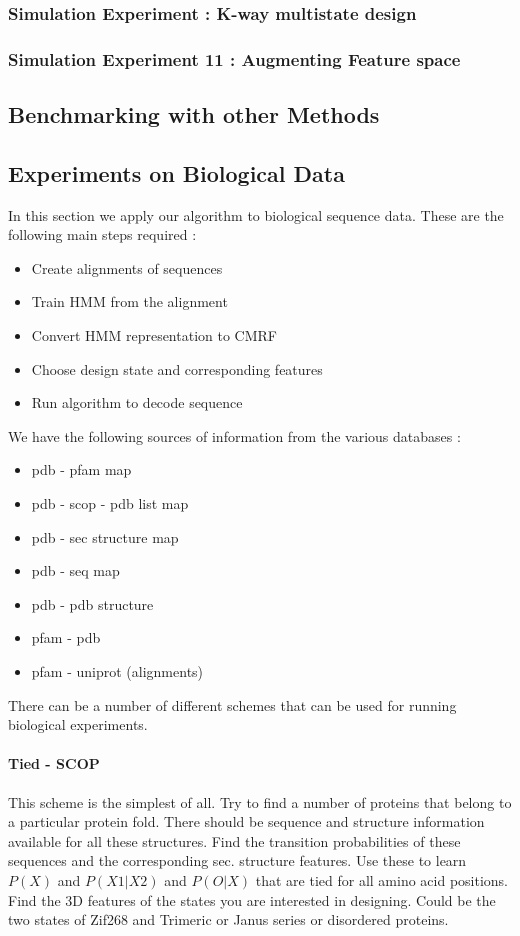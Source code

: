 \documentclass{article}
\begin{document}
\subsubsection{Simulation Experiment : K-way multistate design}

\subsubsection{Simulation Experiment 11 : Augmenting Feature space}

\subsection{Benchmarking with other Methods}

\subsection{Experiments on Biological Data}
In this section we apply our algorithm to biological sequence data. These are the following main steps required : 

\begin{itemize}
\item Create alignments of sequences 
\item Train HMM from the alignment
\item Convert HMM representation to CMRF
\item Choose design state and corresponding features
\item Run algorithm to decode sequence
\end{itemize}

We have the following sources of information from the various databases : 

\begin{itemize}
\item pdb - pfam map
\item pdb - scop - pdb list map
\item pdb - sec structure map
\item pdb - seq map
\item pdb - pdb structure 
\item pfam - pdb 
\item pfam - uniprot (alignments)
\end{itemize}

There can be a number of different schemes that can be used for running biological experiments. 

\paragraph{Tied - SCOP} This scheme is the simplest of all. Try to find a number of proteins that belong to a particular protein fold. There should be sequence and structure information available for all these structures. Find the transition probabilities of these sequences and the corresponding sec. structure features. Use these to learn $P(X)$ and $P(X1|X2)$ and $P(O|X)$ that are tied for all amino acid positions. Find the 3D features of the states you are interested in designing. Could be the two states of Zif268 and Trimeric or Janus series or disordered proteins. 
\end{document}
